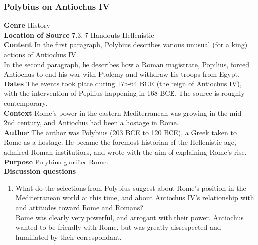 \documentclass{article}
\begin{document}
\subsubsection*{Polybius on Antiochus IV}
\textbf{Genre}
History \\
\textbf{Location of Source}
7.3, 7 Handouts Hellenistic \\
\textbf{Content}
In the first paragraph, Polybius describes various unusual (for a king) actions of Antiochus IV. \\
In the second paragraph, he describes how a Roman magistrate, Popilius, forced Antiochus
to end his war with Ptolemy and withdraw his troops from Egypt. \\
\textbf{Dates}
The events took place during 175-64 BCE (the reign of Antiochus IV), with the intervention
of Popilius happening in 168 BCE. The source is roughly contemporary.  \\
\textbf{Context}
Rome’s power in the eastern Mediterranean was growing in the mid-2nd century, and
Antiochus had been a hostage in Rome. \\
\textbf{Author}
The author was Polybius (203 BCE to 120 BCE), a Greek taken to Rome as a hostage.
He became the foremost historian of the Hellenistic age, admired Roman institutions, and
wrote with the aim of explaining Rome’s rise. \\
\textbf{Purpose}
Polybius glorifies Rome. \\
\textbf{Discussion questions}
\begin{enumerate}
  \item What do the selections from Polybius suggest about Rome’s position in the
  Mediterranean world at this time, and about Antiochus IV’s relationship with and attitudes
  toward Rome and Romans? \\
  Rome was clearly very powerful, and arrogant with their power. Antiochus wanted to be friendly
  with Rome, but was greatly disrespected and humiliated by their correspondant.
\end{enumerate}
\end{document}
